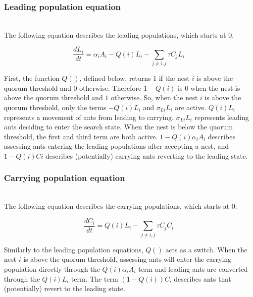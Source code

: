 \documentclass{article}
\begin{document}

\subsubsection{Leading population equation}
\hfill\\

The following equation describes the leading populations, which starts at $0$.

\begin{equation}
        \frac{dL_i}{dt} = \alpha_iA_i - Q(i)L_i - \sum_{j \neq i, j} \tau C_jL_i %
\end{equation}

First, the function $Q()$, defined below, returns $1$ if the nest $i$ is above the quorum threshold and $0$ otherwise. Therefore $1 - Q(i)$ is $0$ when the nest is above the quorum threshold and $1$ otherwise.
So, when the nest $i$ is above the quorum threshold, only the terms $-Q(i)L_i$ and $\sigma_{Li}L_i$ are active. $Q(i)L_i$ represents a movement of ants from leading to carrying. $\sigma_{Li}L_i$ represents leading ants deciding to enter the search state.
When the nest is below the quorum threshold, the first and third term are both active. $1-Q(i)\alpha_iA_i$ describes assessing ants entering the leading populations after accepting a nest, and $1-Q(i)Ci$ describes (potentially) carrying ants reverting to the leading state.

\subsubsection{Carrying population equation}
\hfill\\

The following equation describes the carrying populations, which starts at $0$:

\begin{equation}
        \frac{dC_i}{dt} = Q(i)L_i - \sum_{j \neq i, j} \tau C_jC_i %
\end{equation}

Similarly to the leading population equations, $Q()$ acts as a switch. When the nest $i$ is above the quorum threshold, assessing ants will enter the carrying population directly through the $Q(i)\alpha_iA_i$ term and leading ants are converted through the $Q(i)L_i$ term.
The term $(1-Q(i))C_i$ describes ants that (potentially) revert to the leading state. 
\end{document}
